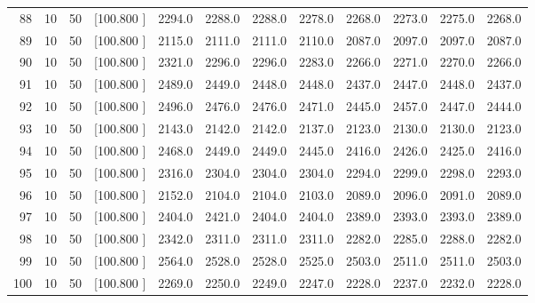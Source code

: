 \documentclass[12pt,a4paper]{article}
\begin{document}
\begin{center}
{\begin{tabular}{r r r r r r r r r r r r}
  88& 10& 50&[100.800   ]&  2294.0&  2288.0&  2288.0&  2278.0&  2268.0&  2273.0&  2275.0&  2268.0\\[-0.02in]
  89& 10& 50&[100.800   ]&  2115.0&  2111.0&  2111.0&  2110.0&  2087.0&  2097.0&  2097.0&  2087.0\\[-0.02in]
  90& 10& 50&[100.800   ]&  2321.0&  2296.0&  2296.0&  2283.0&  2266.0&  2271.0&  2270.0&  2266.0\\[-0.02in]
  91& 10& 50&[100.800   ]&  2489.0&  2449.0&  2448.0&  2448.0&  2437.0&  2447.0&  2448.0&  2437.0\\[-0.02in]
  92& 10& 50&[100.800   ]&  2496.0&  2476.0&  2476.0&  2471.0&  2445.0&  2457.0&  2447.0&  2444.0\\[-0.02in]
  93& 10& 50&[100.800   ]&  2143.0&  2142.0&  2142.0&  2137.0&  2123.0&  2130.0&  2130.0&  2123.0\\[-0.02in]
  94& 10& 50&[100.800   ]&  2468.0&  2449.0&  2449.0&  2445.0&  2416.0&  2426.0&  2425.0&  2416.0\\[-0.02in]
  95& 10& 50&[100.800   ]&  2316.0&  2304.0&  2304.0&  2304.0&  2294.0&  2299.0&  2298.0&  2293.0\\[-0.02in]
  96& 10& 50&[100.800   ]&  2152.0&  2104.0&  2104.0&  2103.0&  2089.0&  2096.0&  2091.0&  2089.0\\[-0.02in]
  97& 10& 50&[100.800   ]&  2404.0&  2421.0&  2404.0&  2404.0&  2389.0&  2393.0&  2393.0&  2389.0\\[-0.02in]
  98& 10& 50&[100.800   ]&  2342.0&  2311.0&  2311.0&  2311.0&  2282.0&  2285.0&  2288.0&  2282.0\\[-0.02in]
  99& 10& 50&[100.800   ]&  2564.0&  2528.0&  2528.0&  2525.0&  2503.0&  2511.0&  2511.0&  2503.0\\[-0.02in]
 100& 10& 50&[100.800   ]&  2269.0&  2250.0&  2249.0&  2247.0&  2228.0&  2237.0&  2232.0&  2228.0\\[-0.02in]

\hline
\end{tabular}}
\end{center}
\newpage
\end{document}
